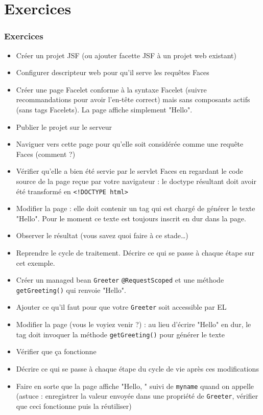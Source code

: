 \documentclass[english, french]{beamer}
\begin{document}
\section{Exercices}
\begin{frame}[allowframebreaks]
	\frametitle{Exercices}
	\begin{itemize}
		\item Créer un projet JSF (ou ajouter facette JSF à un projet web existant)
		\item Configurer descripteur web pour qu’il serve les requêtes Faces
		\item Créer une page Facelet  conforme à la syntaxe Facelet (suivre recommandations pour avoir l’en-tête correct) mais sans composants actifs (sans tags Facelets). La page affiche simplement "Hello".
		\item Publier le projet sur le serveur
		\item Naviguer vers cette page pour qu’elle soit considérée comme une requête Faces (comment ?)
		\item Vérifier qu’elle a bien été servie par le servlet Faces en regardant le code source de la page reçue par votre navigateur : le doctype résultant doit avoir été transformé en \texttt{<!DOCTYPE html>}
		\item Modifier la page  : elle doit contenir un tag  qui est chargé de générer le texte "Hello". Pour le moment ce texte est toujours inscrit en dur dans la page.
		\item Observer le résultat (vous savez quoi faire à ce stade…)
		\item Reprendre le cycle de traitement. Décrire ce qui se passe à chaque étape sur cet exemple.
		\item Créer un managed bean \texttt{Greeter} \texttt{@RequestScoped} et une méthode \texttt{getGreeting()} qui renvoie "Hello".
		\item Ajouter ce qu’il faut pour que votre \texttt{Greeter} soit accessible par EL
		\item Modifier la page (vous le voyiez venir ?) : au lieu d’écrire "Hello" en dur, le tag doit invoquer la méthode \texttt{getGreeting()} pour générer le texte
		\item Vérifier que ça fonctionne
		\item Décrire ce qui se passe à chaque étape du cycle de vie après ces modifications
		\item Faire en sorte que la page affiche "Hello, " suivi de \texttt{myname} quand on appelle  {\tiny (astuce : enregistrer la valeur envoyée dans une propriété de \texttt{Greeter}, vérifier que ceci fonctionne puis la réutiliser)}

\end{itemize}
\end{frame}
\end{document}
